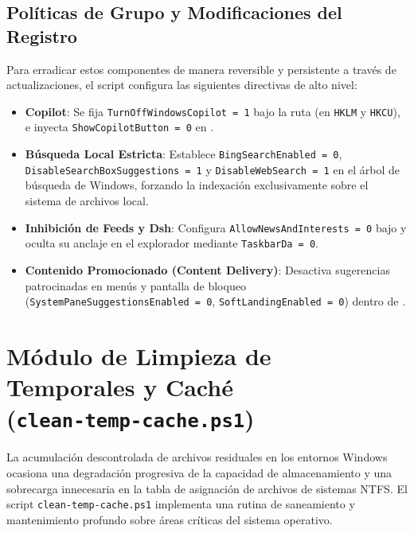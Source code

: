\documentclass[12pt,a4paper]{report}
\begin{document}
\subsection{Políticas de Grupo y Modificaciones del Registro}
Para erradicar estos componentes de manera reversible y persistente a través de actualizaciones, el script configura las siguientes directivas de alto nivel:
\begin{itemize}
    \item \textbf{Copilot}: Se fija \texttt{TurnOffWindowsCopilot = 1} bajo la ruta  (en \texttt{HKLM} y \texttt{HKCU}), e inyecta \texttt{ShowCopilotButton = 0} en .
    \item \textbf{Búsqueda Local Estricta}: Establece \texttt{BingSearchEnabled = 0}, \texttt{DisableSearchBoxSuggestions = 1} y \texttt{DisableWebSearch = 1} en el árbol de búsqueda de Windows, forzando la indexación exclusivamente sobre el sistema de archivos local.
    \item \textbf{Inhibición de Feeds y Dsh}: Configura \texttt{AllowNewsAndInterests = 0} bajo  y oculta su anclaje en el explorador mediante \texttt{TaskbarDa = 0}.
    \item \textbf{Contenido Promocionado (Content Delivery)}: Desactiva sugerencias patrocinadas en menús y pantalla de bloqueo (\texttt{SystemPaneSuggestionsEnabled = 0}, \texttt{SoftLandingEnabled = 0}) dentro de .
\end{itemize}

\section[Módulo de Limpieza de Temporales y Caché]{Módulo de Limpieza de Temporales y Caché\\ \large(\texttt{clean-temp-cache.ps1})}
La acumulación descontrolada de archivos residuales en los entornos Windows ocasiona una degradación progresiva de la capacidad de almacenamiento y una sobrecarga innecesaria en la tabla de asignación de archivos de sistemas NTFS. El script \texttt{clean-temp-cache.ps1} implementa una rutina de saneamiento y mantenimiento profundo sobre áreas críticas del sistema operativo.
\end{document}
